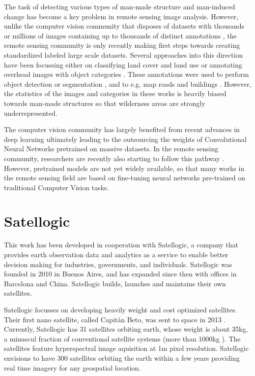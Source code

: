 The task of detecting various types of man-made structure and man-induced change has become a key problem in remote sensing image analysis. However, unlike the computer vision community that disposes of datasets with thousands or millions of images containing up to thousands of distinct annotations \parencite{everingham2010, deng2009, lin2014, krasin2016}, the remote sensing community is only recently making first steps towards creating standardized labeled large scale datasets. Several approaches into this direction have been focussing either on classifying land cover and land use \parencite{sumbul2019} or annotating overhead images with object categories \parencite{vanetten2018, lam2018}. These annotations were used to perform object detection or segmentation \parencite{yang2010, krasin2016}, and to e.g. map roads and buildings \parencite{vanetten2018, vanetten2019}. However, the statistics of the images and categories in these works is heavily biased towards man-made structures so that wilderness areas are strongly underrepresented. 

The computer vision community has largely benefited from recent advances in deep learning ultimately leading to the outsourcing the weights of Convolutional Neural Networks pretrained on massive datasets. In the remote sensing community, researchers are recently also starting to follow this pathway \parencite{sumbul2019}. However, pretrained models are not yet widely available, so that many works in the remote sensing field are based on fine-tuning neural networks  pre-trained on traditional Computer Vision tasks.

\section{Satellogic}
This work has been developed in cooperation with Satellogic, a company that provides earth observation data and analytics as a service to enable better decision making for industries, governments, and individuals. Satellogic was founded in 2010 in Buenos Aires, and has expanded since then with offices in Barcelona and China. Satellogic builds, launches and maintains their own satellites.

Satellogic focusses on developing heavily weight and cost optimized satellites. Their first nano satellite, called Capitán Beto, was sent to space in 2013 \parencite{wiki_satellogic}. Currently, Satellogic has 31 satellites orbiting earth, whose weight is about 35kg, a minuscul fraction of conventional satellite systems (more than 1000kg \parencite{satellogic_youtube}). The satellites feature hyperspectral image aquisition at 1m pixel resolution. Satellogic envisions to have 300 satellites orbiting the earth within a few years providing real time imagery for any geospatial location. 

